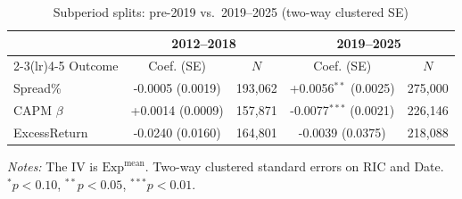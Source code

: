\begin{table}[htbp]
\centering
\caption{Subperiod splits: pre-2019 vs.\ 2019--2025 (two-way clustered SE)}
\label{tab:v2_subperiod}
\begin{threeparttable}
\begin{tabular}{l c c c c}
\toprule
 & \multicolumn{2}{c}{2012--2018} & \multicolumn{2}{c}{2019--2025} \\
\cmidrule(lr){2-3}\cmidrule(lr){4-5}
Outcome & Coef. (SE) & $N$ & Coef. (SE) & $N$ \\
\midrule
Spread\% & -0.0005 (0.0019) & 193,062 & +0.0056$^{**}$ (0.0025) & 275,000 \\
CAPM $\beta$ & +0.0014 (0.0009) & 157,871 & -0.0077$^{***}$ (0.0021) & 226,146 \\
ExcessReturn & -0.0240 (0.0160) & 164,801 & -0.0039 (0.0375) & 218,088 \\
\bottomrule
\end{tabular}
\begin{tablenotes}\small
\item \textit{Notes:} The IV is $\mathrm{Exp}^{\text{mean}}$. Two-way clustered standard errors on RIC and Date.
$^{*}p<0.10$, $^{**}p<0.05$, $^{***}p<0.01$.
\end{tablenotes}
\end{threeparttable}
\end{table}